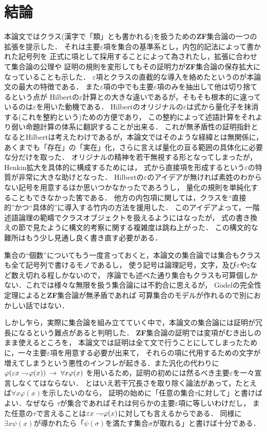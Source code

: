 \chapter{結論}
	本論文ではクラス(漢字で「類」とも書かれる)を扱うための{\bf ZF}集合論の一つの拡張を提示した．
	それは主要$\varepsilon$項を集合の基準系とし，内包的記法によって書かれた記号列を
	正式に項として採用することによって為されたし，拡張に合わせて集合論の公理や
	証明の規則を変形してもその証明力が{\bf ZF}集合論の保存拡大になっていることも示した．
	$\varepsilon$項とクラスの直截的な導入を絡めたというのが本論文の最大の特徴である．
	また$\varepsilon$項の中でも主要$\varepsilon$項のみを抽出して他は切り捨てるという点が
	Hilbertの$\varepsilon$計算との大きな違いであるが，そもそも根本的に違っているのは$\varepsilon$を用いた動機である．
	Hilbertのオリジナルの$\varepsilon$は式から量化子を抹消する(これを整約という)ための方便であり，
	この整約によって述語計算をそれより弱い命題計算の体系に翻訳することが出来る．
	これが無矛盾性の証明指針となるとHilbertは考えたわけであるが，本論文ではそのような経緯とは無関係に，
	あくまでも「存在」の「実在」化，さらに言えば量化の亘る範囲の具体化に必要な分だけを取った．
	オリジナルの精神を若干無視する形となってしまったが，Henkin拡大を具体的に構成するためには，
	式から直接項を形成するという$\varepsilon$の特質が非常に大きな助けとなった．
	Hilbertの$\varepsilon$のアイデアが無ければ素姓のわからない記号を用意するほか思いつかなかったであろうし，
	量化の規則を単純化することもできなかった筈である．
	他方の内包項に関しては，クラスを``直接的''かつ``具体的''に導入する竹内\cite{TakeuchiSet}の方法を援用した．
	このアイデアよって，一階述語論理の範疇でクラスオブジェクトを扱えるようにはなったが，
	式の書き換えの節で見たように構文的考察に関する複雑度は跳ね上がった．
	この構文的な難所はもう少し見通し良く書き直す必要がある．
	
	集合の``個数''についてもう一度言っておくと，本論文の集合論では集合もクラスも全て記号列で書けるモノであるし，
	使う記号は論理記号，文字，及び$\varepsilon$や$\natural$など数え切れる程しかないので，
	序論でも述べた通り集合もクラスも可算個しかない．これでは様々な無限を扱う集合論には不釣合に思えるが，
	G$\ddot{\mbox{o}}$delの完全性定理によると{\bf ZF}集合論が無矛盾であれば
	可算集合のモデルが作れるので別におかしい話ではない．
	
	しかし乍ら，実際に集合論を組み立てていく中で，本論文の集合論には証明が冗長になるという難点があると判明した．
	{\bf ZF}集合論の証明では変項がむき出しのまま使えるところを，
	本論文では証明は全て文で行うことにしてしまったために，一々主要$\varepsilon$項を用意する必要が出来て，
	それらの項に代用するための文字が増えてしまうという悪性のインフレが起きる．また汎化の代わりに
	$\varphi(\varepsilon x \rightharpoondown\hspace{-0.25em} \varphi(x)) \hspace{0.25em}\rightarrow\hspace{0.25em} \forall x \varphi(x)$
	を用いるため，証明の初めには然るべき主要$\varepsilon$を一々宣言しなくてはならない．
	とはいえ若干冗長さを取り除く論法があって，たとえば$\forall x \varphi(x)$を示したいのなら，
	証明の始めに「任意の集合$\tau$に対して」と書けばよい．なぜなら
	$\tau$が集合であればそれは何らかの主要$\varepsilon$項に等しいわけだし，
	また任意の$\tau$で言えることは$\varepsilon x \rightharpoondown\hspace{-0.25em} \varphi(x)$に対しても言えるからである．
	同様に$\exists x \psi(x)$が導かれたら「$\psi(\sigma)$を満たす集合$\sigma$が取れる」と書けば十分である．
	
